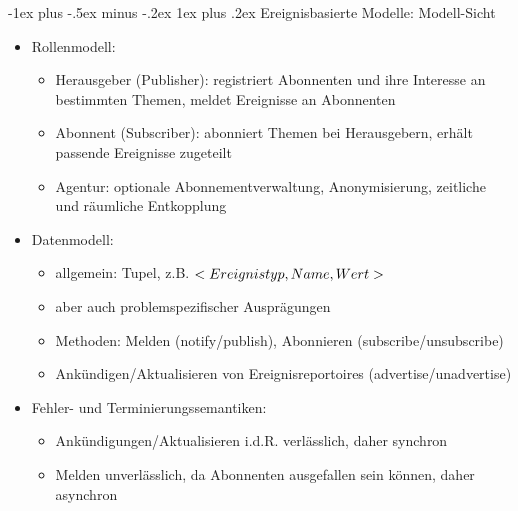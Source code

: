 \documentclass[10pt]{article}
\makeatletter
\renewcommand{\subsubsection}{\@startsection{subsubsection}{3}{0mm}%
                                {-1ex plus -.5ex minus -.2ex}%
                                {1ex plus .2ex}%
                                {\normalfont\small\bfseries}}
\makeatother
\begin{document}
\subsubsection{Ereignisbasierte Modelle: Modell-Sicht}
\begin{itemize}
  \item Rollenmodell:
        \begin{itemize}
          \item Herausgeber (Publisher): registriert Abonnenten und ihre Interesse an bestimmten Themen, meldet Ereignisse an Abonnenten
          \item Abonnent (Subscriber): abonniert Themen bei Herausgebern, erhält passende Ereignisse zugeteilt
          \item Agentur: optionale Abonnementverwaltung, Anonymisierung, zeitliche und räumliche Entkopplung
        \end{itemize}
  \item Datenmodell:
        \begin{itemize}
          \item allgemein: Tupel, z.B. $<Ereignistyp,\space Name,\space Wert>$
          \item aber auch problemspezifischer Ausprägungen
          \item Methoden: Melden (notify/publish), Abonnieren (subscribe/unsubscribe)
          \item Ankündigen/Aktualisieren von Ereignisreportoires (advertise/unadvertise)
        \end{itemize}
  \item Fehler- und Terminierungssemantiken:
        \begin{itemize}
          \item Ankündigungen/Aktualisieren i.d.R. verlässlich, daher synchron
          \item Melden unverlässlich, da Abonnenten ausgefallen sein können, daher asynchron
        \end{itemize}
\end{itemize}
\end{document}
